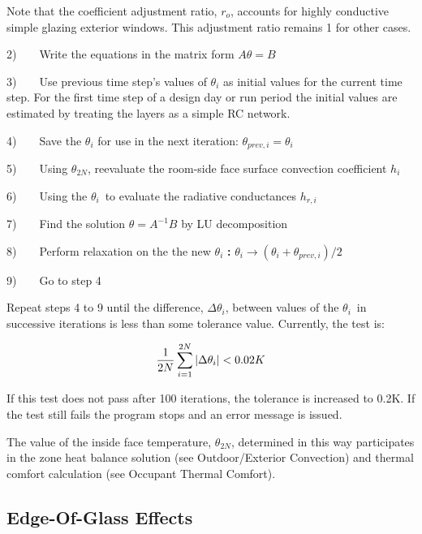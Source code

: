 Note that the coefficient adjustment ratio, \({r_o}\), accounts for highly conductive simple glazing exterior windows. This adjustment ratio remains 1 for other cases.

2)~~~~Write the equations in the matrix form \(A\theta = B\)

3)~~~~Use previous time step's values of \({\theta_i}\) as initial values for the current time step. For the first time step of a design day or run period the initial values are estimated by treating the layers as a simple RC network.

4)~~~~Save the \({\theta_i}\) for use in the next iteration: \({\theta_{prev,i}} = {\theta_i}\)

5)~~~~Using \({\theta_{2N}}\), reevaluate the room-side face surface convection coefficient \({h_i}\)

6)~~~~Using the \({\theta_i}\)~to evaluate the radiative conductances \({h_{r,i}}\)

7)~~~~Find the solution \(\theta = {A^{ - 1}}B\) by LU decomposition

8)~~~~Perform relaxation on the the new \({\theta_i}\) \textbf{:} \({\theta_i} \to \left( {{\theta_i} + {\theta_{prev,i}}} \right)/2\)

9)~~~~Go to step 4

Repeat steps 4 to 9 until the difference, \(\Delta {\theta_i}\), between values of the \({\theta_i}\)~in successive iterations is less than some tolerance value. Currently, the test is:

\begin{equation}
\frac{1}{{2N}}\sum\limits_{i = 1}^{2N} {|\Delta {\theta_i}|{\rm{ }} < 0.02K}
\end{equation}

If this test does not pass after 100 iterations, the tolerance is increased to 0.2K. If the test still fails the program stops and an error message is issued.

The value of the inside face temperature, \({\theta_{2N}}\), determined in this way participates in the zone heat balance solution (see Outdoor/Exterior Convection) and thermal comfort calculation (see Occupant Thermal Comfort).

\subsection{Edge-Of-Glass Effects}\label{edge-of-glass-effects}

